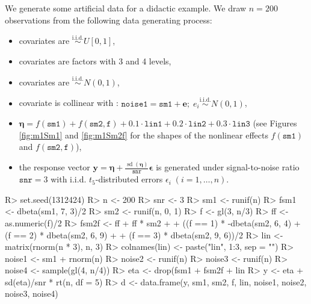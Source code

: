 \documentclass[article, shortnames, nojss, noheadings, notitle]{jss}
\newcommand{\iid} {\operatorname{i.i.d.}}
\begin{document}
We generate some artificial data for a didactic example.
We draw $n=200$ observations from the following data generating process:
\begin{itemize}
\item covariates  are $\stackrel{\iid}{\sim} U[0,1]$,
\item covariates  are factors with 3 and 4 levels,
\item covariates  are $\stackrel{\iid}{\sim} N(0,1)$,
\item covariate  is collinear with : $\mathtt{noise1} = \mathtt{sm1} + \bm e;\; e_i \stackrel{\iid}{\sim} N(0,1)$,
\item $\bm{\eta}  = f(\mathtt{sm1}) + f(\mathtt{sm2, f}) + 0.1 \cdot \mathtt{lin1} + 0.2\cdot\mathtt{lin2} + 0.3\cdot\mathtt{lin3}$
        (see Figures \ref{fig:m1Sm1} and \ref{fig:m1Sm2f} for the shapes of the nonlinear effects $f(\mathtt{sm1})$ and $f(\mathtt{sm2, f})$),
\item  the response vector $\bm y = \bm{\eta} +  \tfrac{\operatorname{sd}(\bm \eta)}{\mathtt{snr}} \bm\epsilon$ is generated under signal-to-noise ratio $\mathtt{snr}=3$
with i.i.d. $t_5$-distributed errors $\epsilon_i\;(i=1,\ldots,n)$.
\end{itemize}
\begin{Schunk}
\begin{Sinput}
R> set.seed(1312424)
R> n <- 200
R> snr <- 3
R> sm1 <- runif(n)
R> fsm1 <- dbeta(sm1, 7, 3)/2
R> sm2 <- runif(n, 0, 1)
R> f <- gl(3, n/3)
R> ff <- as.numeric(f)/2
R> fsm2f <- ff + ff * sm2 +
+          ((f == 1) * -dbeta(sm2, 6, 4) + (f == 2) * dbeta(sm2, 6, 9) +
+             (f == 3) * dbeta(sm2, 9, 6))/2
R> lin <- matrix(rnorm(n * 3), n, 3)
R> colnames(lin) <- paste("lin", 1:3, sep = "")
R> noise1 <- sm1 + rnorm(n)
R> noise2 <- runif(n)
R> noise3 <- runif(n)
R> noise4 <- sample(gl(4, n/4))
R> eta <- drop(fsm1 + fsm2f + lin %*% c(.1, .2, .3))
R> y <- eta + sd(eta)/snr * rt(n, df = 5)
R> d <- data.frame(y, sm1, sm2, f, lin, noise1, noise2, noise3, noise4)
\end{Sinput}
\end{Schunk}
\end{document}
